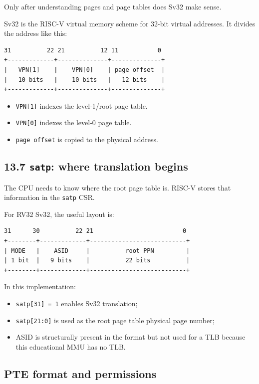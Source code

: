 Only after understanding pages and page tables does Sv32 make sense.

Sv32 is the RISC-V virtual memory scheme for 32-bit virtual addresses. It divides the address like this:

\begin{lstlisting}[language={}]
31          22 21          12 11           0
+-------------+--------------+--------------+
|   VPN[1]    |    VPN[0]    | page offset  |
|   10 bits   |    10 bits   |   12 bits    |
+-------------+--------------+--------------+
\end{lstlisting}

\begin{itemize}
\item \texttt{VPN[1]} indexes the level-1/root page table.
\item \texttt{VPN[0]} indexes the level-0 page table.
\item \texttt{page offset} is copied to the physical address.
\end{itemize}
\subsection{13.7 \texttt{satp}: where translation begins}

The CPU needs to know where the root page table is. RISC-V stores that information in the \texttt{satp} CSR.

For RV32 Sv32, the useful layout is:

\begin{lstlisting}[language={}]
31      30          22 21                         0
+--------+-------------+---------------------------+
| MODE   |    ASID     |          root PPN         |
| 1 bit  |   9 bits    |          22 bits          |
+--------+-------------+---------------------------+
\end{lstlisting}

In this implementation:

\begin{itemize}
\item \texttt{satp[31] = 1} enables Sv32 translation;
\item \texttt{satp[21:0]} is used as the root page table physical page number;
\item ASID is structurally present in the format but not used for a TLB because this educational MMU has no TLB.
\end{itemize}
\subsection{PTE format and permissions}

